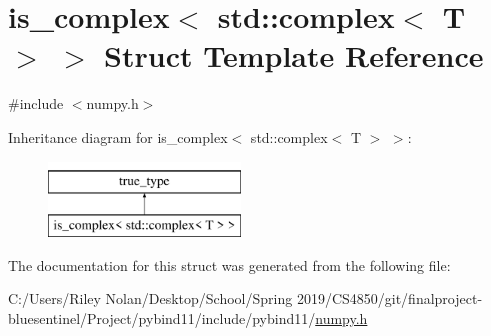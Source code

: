 \hypertarget{structis__complex_3_01std_1_1complex_3_01_t_01_4_01_4}{}\section{is\+\_\+complex$<$ std\+::complex$<$ T $>$ $>$ Struct Template Reference}
\label{structis__complex_3_01std_1_1complex_3_01_t_01_4_01_4}


{\ttfamily \#include $<$numpy.\+h$>$}

Inheritance diagram for is\+\_\+complex$<$ std\+::complex$<$ T $>$ $>$\+:\begin{figure}[H]
\begin{center}
\leavevmode
\includegraphics[height=2.000000cm]{structis__complex_3_01std_1_1complex_3_01_t_01_4_01_4}
\end{center}
\end{figure}


The documentation for this struct was generated from the following file\+:\begin{DoxyCompactItemize}
\item 
C\+:/\+Users/\+Riley Nolan/\+Desktop/\+School/\+Spring 2019/\+C\+S4850/git/finalproject-\/bluesentinel/\+Project/pybind11/include/pybind11/\mbox{\hyperlink{numpy_8h}{numpy.\+h}}\end{DoxyCompactItemize}
